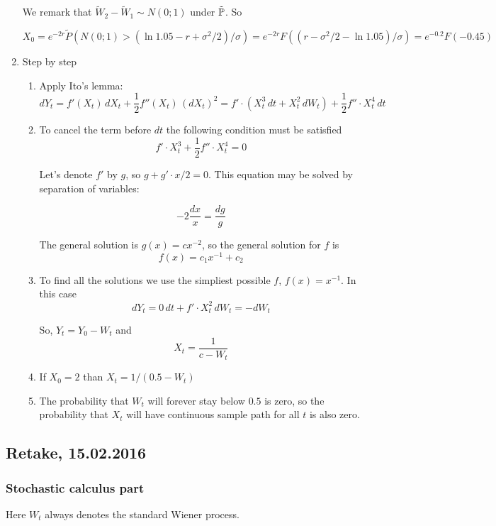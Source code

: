 \documentclass[12pt, a4paper]{article}
\begin{document}
\begin{enumerate}
We remark that $\tilde W_2 - \tilde W_1 \sim N(0; 1)$ under $\tilde \P$. So

\[
X_0 = e^{-2r} \tilde P( N(0; 1) > (\ln 1.05 - r + \sigma^2/2)/\sigma ) = e^{-2r}F((r-\sigma^2/2 - \ln 1.05)/\sigma) = e^{-0.2}F(-0.45)
\]


\item Step by step
\begin{enumerate}
\item Apply Ito's lemma:
\[
dY_t = f'(X_t) \, dX_t + \frac{1}{2} f''(X_t) \, (dX_t)^2 = f'\cdot (X_t^3 \, dt + X_t^2 \, dW_t) + \frac{1}{2}f''\cdot X_t^4 \, dt
\]
\item To cancel the term before $dt$ the following condition must be satisfied
\[
f' \cdot X_t^3 + \frac{1}{2} f'' \cdot X_t^4 = 0
\]

Let's denote $f'$ by $g$, so $g + g'\cdot x /2 = 0$. This equation may be solved by separation of variables:

\[
-2\frac{dx}{x}=\frac{dg}{g}
\]

The general solution is $g(x)=c x^{-2}$, so the general solution for $f$ is
\[
f(x)=c_1 x^{-1} + c_2
\]

\item To find all the solutions we use the simpliest possible $f$, $f(x)=x^{-1}$. In this case
\[
dY_t= 0\, dt + f' \cdot X_t^2 \, dW_t = - dW_t
\]

So, $Y_t = Y_0 - W_t$ and
\[
X_t = \frac{1}{c - W_t}
\]

\item If $X_0=2$ than $X_t = 1/ (0.5 - W_t)$

\item The probability that $W_t$ will forever stay below $0.5$ is zero, so the probability that $X_t$ will have continuous sample path for all $t$ is also zero.

\end{enumerate}

\end{enumerate}


\subsection{Retake, 15.02.2016}

\subsubsection*{Stochastic calculus part}


Here $W_t$ always denotes the standard Wiener process.
\end{document}

